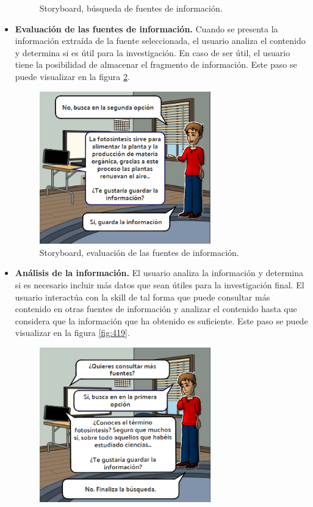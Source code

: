 \begin{itemize}
\begin{figure}
    \caption{Storyboard, búsqueda de fuentes de información.}
    \label{fig:417}
  \end{figure}
  \item \textbf{Evaluación de las fuentes de información.} Cuando se presenta la información extraída de la fuente seleccionada, el usuario analiza el contenido y determina si es útil para la investigación. En caso de ser útil, el usuario tiene la posibilidad de almacenar el fragmento de información. Este paso se puede visualizar en la figura \ref{fig:418}.
  \begin{figure}
    \centering
    \includegraphics[width=0.70\textwidth]{Cap4/Figuras/03.png}
    \caption{Storyboard, evaluación de las fuentes de información.}
    \label{fig:418}
  \end{figure}
  \item \textbf{Análisis de la información.} El usuario analiza la información y determina si es necesario incluir más datos que sean útiles para la investigación final. El usuario interactúa con la skill de tal forma que puede consultar más contenido en otras fuentes de información y analizar el contenido hasta que considera que la información que ha obtenido es suficiente. Este paso se puede visualizar en la figura \ref{fig:419}.
  \begin{figure}
    \centering
    \includegraphics[width=0.70\textwidth]{Cap4/Figuras/04.png}

\end{figure}
\end{itemize}
